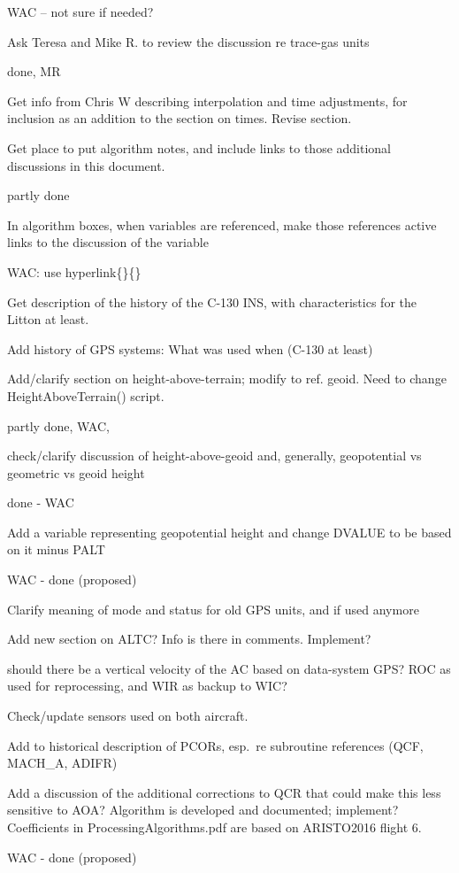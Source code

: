 \documentclass[
  english,
]{book}
\begin{document}
WAC -- not sure if needed?

Ask Teresa and Mike R. to review the discussion re trace-gas units

done, MR

Get info from Chris W describing interpolation and time adjustments, for inclusion as an addition to the section on times. Revise section.

Get place to put algorithm notes, and include links to those additional discussions in this document.

partly done

In algorithm boxes, when variables are referenced, make those references active links to the discussion of the variable

WAC: use hyperlink\{\}\{\}

Get description of the history of the C-130 INS, with characteristics for the Litton at least.

Add history of GPS systems: What was used when (C-130 at least)

Add/clarify section on height-above-terrain; modify to ref. geoid. Need to change HeightAboveTerrain() script.

partly done, WAC,

check/clarify discussion of height-above-geoid and, generally, geopotential vs geometric vs geoid height

done - WAC

Add a variable representing geopotential height and change DVALUE to be based on it minus PALT

WAC - done (proposed)

Clarify meaning of mode and status for old GPS units, and if used anymore

Add new section on ALTC? Info is there in comments. Implement?

should there be a vertical velocity of the AC based on data-system GPS? ROC as used for reprocessing, and WIR as backup to WIC?

Check/update sensors used on both aircraft.

Add to historical description of PCORs, esp.~re subroutine references (QCF, MACH\_A, ADIFR)

Add a discussion of the additional corrections to QCR that could make this less sensitive to AOA? Algorithm is developed and documented; implement? Coefficients in ProcessingAlgorithms.pdf are based on ARISTO2016 flight 6.

WAC - done (proposed)
\end{document}
